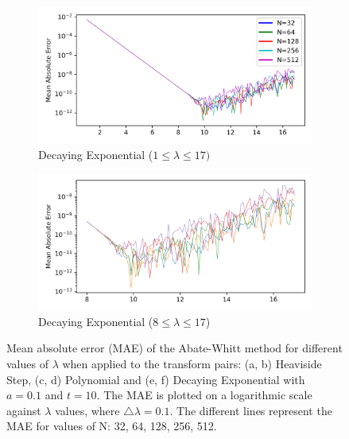 \documentclass[a4paper]{report}
\begin{document}
\begin{figure}[H]
    \begin{subfigure}{.5\linewidth}
      \includegraphics[width=\linewidth]{images/abate_whitt/decaying_exp.png}
      \caption{Decaying Exponential ($1 \leq \lambda \leq 17)$}
    \end{subfigure}\hfill
    \begin{subfigure}{.5\linewidth}
      \includegraphics[width=\linewidth]{images/abate_whitt/decaying_exp_zoomed.png}
      \caption{Decaying Exponential ($8 \leq \lambda \leq 17$)}
    \end{subfigure}
    
    \caption{Mean absolute error (MAE) of the Abate-Whitt method for different values of $\lambda$ when applied to the transform pairs: (a, b) Heaviside Step, (c, d) Polynomial and (e, f) Decaying Exponential with $a = 0.1$ and $t = 10$. The MAE is plotted on a logarithmic scale against $\lambda$ values, where $\triangle \lambda = 0.1$. The different lines represent the MAE for values of N: 32, 64, 128, 256, 512.}
    \label{fig:MAE_Abate_Whitt}
\end{figure}
\end{document}
